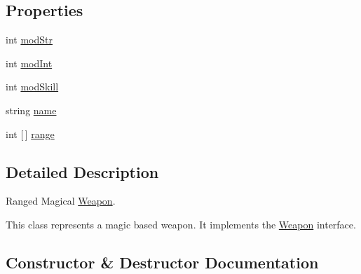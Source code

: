 \subsection*{Properties}
\begin{DoxyCompactItemize}
\item 
int \hyperlink{class_model_1_1_weapon_module_1_1_fireblast_a1ad6c3bbb2766fa40924346f3c20008f}{mod\+Str}
\item 
int \hyperlink{class_model_1_1_weapon_module_1_1_fireblast_a1d136d30cb83e0d1d2c137cc3159a03a}{mod\+Int}
\item 
int \hyperlink{class_model_1_1_weapon_module_1_1_fireblast_a543183fac09bb809918413bb64c75087}{mod\+Skill}
\item 
string \hyperlink{class_model_1_1_weapon_module_1_1_fireblast_a842a73ba66f7451a745ed25e770c12bd}{name}
\item 
int \mbox{[}$\,$\mbox{]} \hyperlink{class_model_1_1_weapon_module_1_1_fireblast_af78d9b434462c20e6946d92db86556dc}{range}
\end{DoxyCompactItemize}


\subsection{Detailed Description}
Ranged Magical \hyperlink{interface_model_1_1_weapon_module_1_1_weapon}{Weapon}. 

This class represents a magic based weapon. It implements the \hyperlink{interface_model_1_1_weapon_module_1_1_weapon}{Weapon} interface. 

\subsection{Constructor \& Destructor Documentation}
\hypertarget{class_model_1_1_weapon_module_1_1_fireblast_ad225a3a6bf2366ae5d431e775b0f8396}{}\label{class_model_1_1_weapon_module_1_1_fireblast_ad225a3a6bf2366ae5d431e775b0f8396} 
